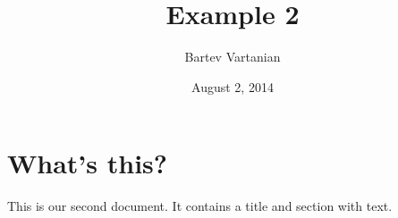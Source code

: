 \documentclass[letter, 11pt]{article}
\begin{document}
 
\title{Example 2} 
\author{Bartev Vartanian} 
\date{August 2, 2014} 
\maketitle 
\section{What's this?} 

This is our second document. It contains a title and section with text. 
\end{document}
